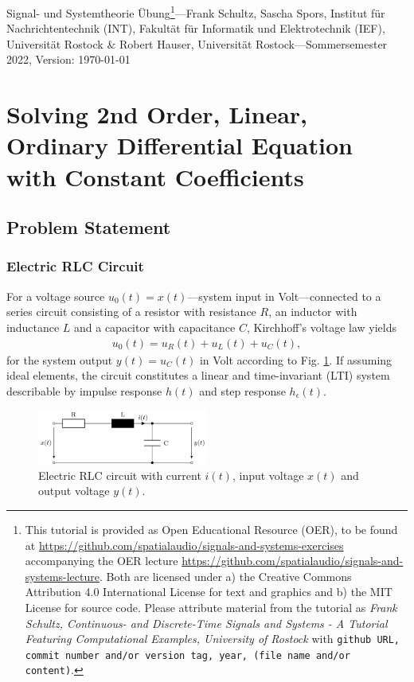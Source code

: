 \documentclass[11pt,a4paper,DIV=12]{scrartcl}
\begin{document}
%
\noindent Signal- und Systemtheorie Übung\footnote{This tutorial is provided as
Open Educational Resource (OER), to be found at
\url{https://github.com/spatialaudio/signals-and-systems-exercises}
accompanying the OER lecture
\url{https://github.com/spatialaudio/signals-and-systems-lecture}.
%
Both are licensed under a) the Creative Commons Attribution 4.0 International
License for text and graphics and b) the MIT License for source code.
%
Please attribute material from the tutorial as \textit{Frank Schultz,
Continuous- and Discrete-Time Signals and Systems - A Tutorial Featuring
Computational Examples, University of Rostock} with
\texttt{github URL, commit number and/or version tag, year, (file name and/or
content)}.}---Frank Schultz, Sascha Spors,
Institut für Nachrichtentechnik (INT),
Fakultät für Informatik und Elektrotechnik (IEF),
Universität Rostock \&
Robert Hauser, Universität Rostock---Sommersemester 2022, Version: \today

\tableofcontents

\section{Solving 2nd Order, Linear, Ordinary Differential Equation with
Constant Coefficients}
\subsection{Problem Statement}
\subsubsection{Electric RLC Circuit}
For a voltage source $u_0(t)=x(t)$---system input in Volt---connected to a
series circuit consisting of
a resistor with resistance $R$,
an inductor with inductance $L$ and
a capacitor with capacitance $C$,
Kirchhoff's voltage law yields
\begin{align}
\label{eq:KirchhoffLaw}
u_0(t) = u_R(t) + u_L(t) + u_C(t),
\end{align}
for the system output $y(t) = u_C(t)$ in Volt according to Fig. \ref{fig:lowpass}.
If assuming ideal elements, the circuit constitutes a linear and time-invariant
(LTI) system describable by impulse response $h(t)$ and step response
$h_\epsilon(t)$.
%
\begin{figure}[h]
\centering
\includegraphics[width=0.5\textwidth]{../laplace_transform/lowpass.png}
\caption{Electric RLC circuit with current $i(t)$, input voltage $x(t)$
and output voltage $y(t)$.}
\label{fig:lowpass}
\end{figure}
\end{document}
